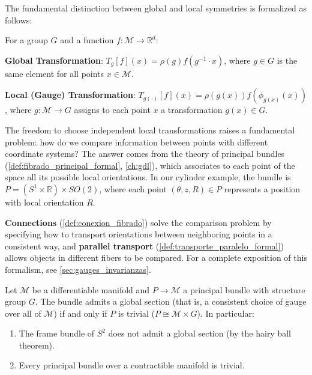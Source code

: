 The fundamental distinction between global and local symmetries is formalized as follows:

\begin{definition}
For a group $G$ and a function $f: \mathcal{M} \to \mathbb{R}^d$:

\textbf{Global Transformation}: $T_g[f](x) = \rho(g) f(g^{-1} \cdot x)$, where $g \in G$ is the same element for all points $x \in \mathcal{M}$.

\textbf{Local (Gauge) Transformation}: $T_{g(\cdot)}[f](x) = \rho(g(x)) f(\phi_{g(x)}(x))$, where $g: \mathcal{M} \to G$ assigns to each point $x$ a transformation $g(x) \in G$.
\end{definition}

The freedom to choose independent local transformations raises a fundamental problem: how do we compare information between points with different coordinate systems? The answer comes from the theory of principal bundles (\autoref{def:fibrado_principal_formal}, \autoref{ch:gdl}), which associates to each point of the space all its possible local orientations. In our cylinder example, the bundle is $P = (S^1 \times \mathbb{R}) \times SO(2)$, where each point $(\theta, z, R) \in P$ represents a position with local orientation $R$.

\textbf{Connections} (\autoref{def:conexion_fibrado}) solve the comparison problem by specifying how to transport orientations between neighboring points in a consistent way, and \textbf{parallel transport} (\autoref{def:transporte_paralelo_formal}) allows objects in different fibers to be compared. For a complete exposition of this formalism, see \autoref{sec:gauges_invarianzas}.

\begin{proposition}\label{prop:obstruccion_gauge_global}
Let $\mathcal{M}$ be a differentiable manifold and $P \to \mathcal{M}$ a principal bundle with structure group $G$. The bundle admits a global section (that is, a consistent choice of gauge over all of $\mathcal{M}$) if and only if $P$ is trivial ($P \cong \mathcal{M} \times G$). In particular:
\begin{enumerate}
    \item The frame bundle of $S^2$ does not admit a global section (by the hairy ball theorem).
    \item Every principal bundle over a contractible manifold is trivial.
\end{enumerate}
\end{proposition}

